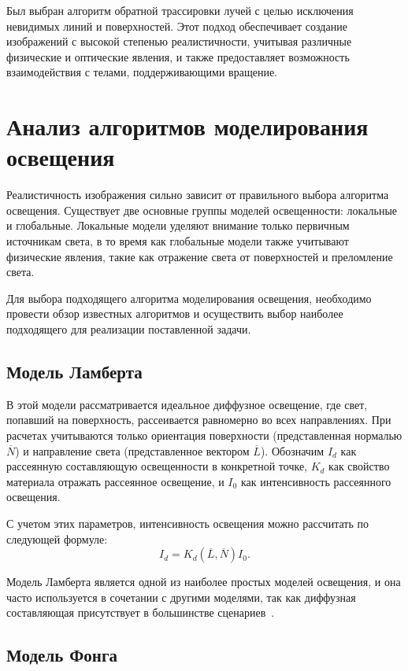Был выбран алгоритм обратной трассировки лучей с целью исключения невидимых линий и поверхностей. 
Этот подход обеспечивает создание изображений с высокой степенью реалистичности, учитывая различные физические и оптические явления, и также предоставляет возможность взаимодействия с телами, поддерживающими вращение.

\section{Анализ алгоритмов моделирования освещения}

Реалистичность изображения сильно зависит от правильного выбора алгоритма освещения. 
Существует две основные группы моделей освещенности: локальные и глобальные. 
Локальные модели уделяют внимание только первичным источникам света, в то время как глобальные модели также учитывают физические явления, такие как отражение света от поверхностей и преломление света.

Для выбора подходящего алгоритма  моделирования освещения, необходимо
провести обзор известных алгоритмов и осуществить выбор наиболее
подходящего для реализации поставленной задачи.

\subsection{Модель Ламберта}

В этой модели рассматривается идеальное диффузное освещение, где свет, попавший на поверхность, рассеивается равномерно во всех направлениях. 
При расчетах учитываются только ориентация поверхности (представленная нормалью $\overline{N}$)  и направление света (представленное вектором $\overline{L}$). 
Обозначим $I_d$ как рассеянную составляющую освещенности в конкретной точке, $K_d$ как свойство материала отражать рассеянное освещение, и $I_0$ как интенсивность рассеянного освещения.

С учетом этих параметров, интенсивность освещения можно рассчитать по следующей формуле:
\begin{equation}
	I_d = K_d(\overline{L}, \overline{N})I_0.
	\label{fig:equation_1}
\end{equation}

Модель Ламберта является одной из наиболее простых моделей освещения, и она часто используется в сочетании с другими моделями, так как диффузная составляющая присутствует в большинстве сценариев~\cite{lambert}.

\subsection{Модель Фонга}

